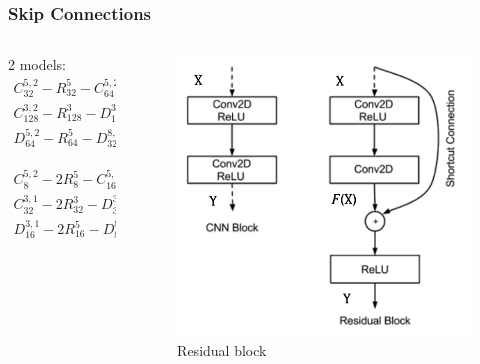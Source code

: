 \documentclass [handout] {beamer}
\begin{document}
\begin{frame}
	\frametitle{Skip Connections}
	\begin{columns}
		\begin{column}{0.4\textwidth}
	2 models:
	\begin{equation}
	\begin{split}
		C_{32}^{5,2} - R_{32}^5 - C_{64}^{5,2} - R_{64}^5 - \\ C_{128}^{3,2} - R_{128}^3 - D_{128}^{3,2} - R_{128}^5 -\\ D_{64}^{5,2} - R_{64}^5 - D_{32}^{8,2} - D_{3,p}^{3,1}
	\end{split}
	\label{ResNet_v1}
	\end{equation}

	\begin{equation}
	\begin{split}
		C_{8}^{5,2} - 2R_{8}^5 - C_{16}^{5,2} - 2R_{16}^5 - \\ C_{32}^{3,1} - 2R_{32}^3 - D_{32}^{3,1} - 2R_{32}^5 -\\ D_{16}^{3,1} - 2R_{16}^5 - D_{8}^{8,1} - D_{3,p}^{3,1} 
	\end{split}
	\label{ResNet_v2}
	\end{equation}
	\end{column}
	\begin{column}{0.4\textwidth}
	\begin{figure}[hbtp]
		\centering
		\includegraphics[scale=0.35]{../ResidualBlock.png}
		\caption{Residual block}\label{residual_block}
	\end{figure}
	\end{column}
	\end{columns}
\end{frame}
\end{document}
